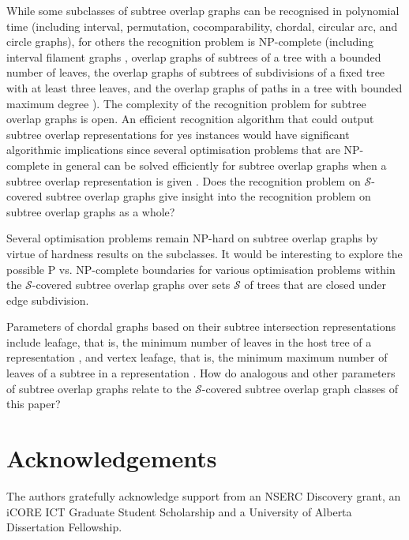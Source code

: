 \documentclass[
final
]{dmtcs-episciences}        \usepackage{graphics, amsthm, amsmath, amssymb, algorithm, algorithmic}
\begin{document}
While some subclasses of subtree overlap graphs can be recognised in polynomial time (including interval, permutation, cocomparability, chordal, circular arc, and circle graphs), for others the recognition problem is NP-complete (including interval filament graphs \cite{Perm},  overlap graphs of subtrees of a tree with a bounded number of leaves, the overlap graphs of subtrees of subdivisions of a fixed tree with at least three leaves, and the overlap graphs of paths in a tree with bounded maximum degree \cite{JessThesis,PergelThesis}). The complexity of the recognition problem for subtree overlap graphs is open.  
An efficient recognition algorithm that could output subtree overlap representations for yes instances would have significant algorithmic implications since several optimisation problems that are NP-complete in general can be solved efficiently for subtree overlap graphs when a subtree overlap representation is given \cite{eowynStewart, gavril2007, gavril2009, gavril2011, Keil}. Does the recognition problem on $\mathcal{S}$-covered subtree overlap graphs give insight into the recognition problem on subtree overlap graphs as a whole?

Several optimisation problems remain NP-hard on subtree overlap graphs by virtue of hardness results on the subclasses. It would be interesting to explore the possible P vs. NP-complete boundaries for various optimisation problems within the 
$\mathcal{S}$-covered subtree overlap graphs
over sets $\mathcal{S}$ of trees that are closed under edge subdivision.

Parameters of chordal graphs based on their subtree intersection representations include leafage, that is,
the minimum number of leaves in the host tree of a representation \cite{LinMcKeeWest}, and vertex leafage, that is,
the minimum maximum number of leaves of a subtree in a representation \cite{ChaplickStacho}.
How do analogous and other parameters of subtree overlap graphs relate to the $\mathcal{S}$-covered subtree overlap graph classes of this paper?


\section{Acknowledgements}
The authors gratefully acknowledge support from an NSERC Discovery grant, an iCORE ICT Graduate Student Scholarship and a University of Alberta Dissertation Fellowship.


\end{document}
